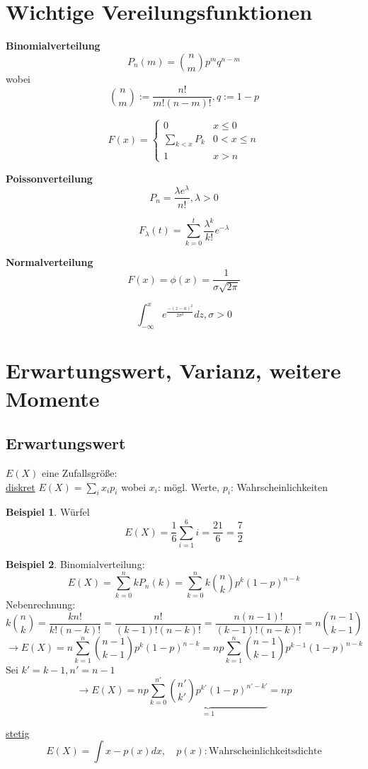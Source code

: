 \documentclass[10pt]{report}
\theoremstyle{definition}
\newtheorem{exmp}{Beispiel}
\begin{document}
\section{Wichtige Vereilungsfunktionen}
\textbf{Binomialverteilung}
\[ P_n(m)=\binom{n}{m}p^m q^{n-m} \] 
wobei \[ \binom{n}{m}:=\frac{n!}{m!(n-m)!}, q:= 1-p \] 

\[ F(x)=
  \begin{cases}
    0 & x \leq 0 \\
    \sum\limits_{k<x}P_k & 0 < x \leq n \\
    1 & x > n
  \end{cases}
\] 

\textbf{Poissonverteilung}
\[ P_n=\frac{\lambda e^{\lambda}}{n!}, \lambda > 0 \]

\[ F_{\lambda}(t)=\sum_{k=0}^t \frac{\lambda^k}{k!}e^{-\lambda} \]

\textbf{Normalverteilung}
\[ F(x)=\phi(x)=\frac{1}{\sigma\sqrt{2\pi}} \]

\[ \int_{-\infty}^x e^{\frac{-(z-a)^2}{2\sigma^2}} dz , \sigma > 0 \]

\section{Erwartungswert, Varianz, weitere Momente}
\subsection{Erwartungswert} $E(X)$ eine Zufallsgröße:\\
\underline{diskret} $E(X)=\sum_i x_i p_i$ wobei $x_i$: mögl. Werte, $p_i$: Wahrscheinlichkeiten \\

\begin{exmp}
	Würfel 
	\[ E(X)=\frac{1}{6} \sum_{i=1}^6 i = \frac{21}{6} = \frac{7}{2} \]
\end{exmp}
\begin{exmp}
	Binomialverteilung: 
	\[ E(X)= \sum_{k=0}^n k P_n(k) = \sum_{k=0}^n k \binom{n}{k} p^k(1-p)^{n-k} \] 
	Nebenrechnung:
	\[ k \binom{n}{k} = \frac{k n!}{k! (n-k)!} = \frac{n!}{(k-1)!(n-k)!} = \frac{n(n-1)!}{(k-1)!(n-k)!} = n \binom{n-1}{k-1} \] 
	\[\rightarrow E(X)= n \sum_{k=1}^{n} \binom{n-1}{k-1} p^k (1-p)^{n-k} = np \sum_{k=1}^n \binom{n-1}{k-1} p^{k-1} (1-p)^{n-k} \] 
	Sei $k'=k-1, n'=n-1$ \\
	\[ \rightarrow E(X)=np \underbrace{\sum_{k=0}^{n'} \binom{n'}{k'} p^{k'}(1-p)^{n'-k'}}_{=1} = np \]
	
	\underline{stetig} 
	\[ E(X)=\int x - p(x) dx , \quad p(x): \text{Wahrscheinlichkeitsdichte} \]
\end{exmp} 
\end{document}
